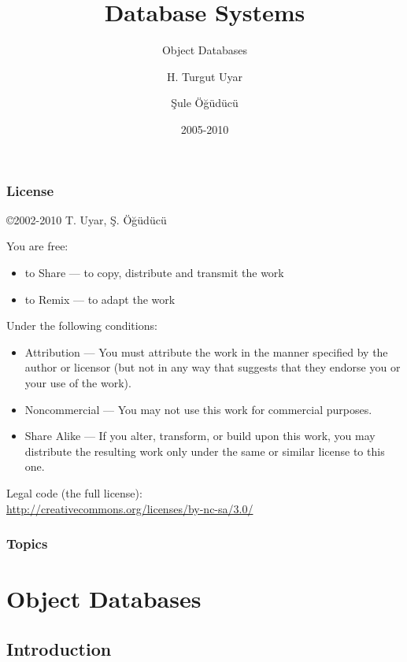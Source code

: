 \documentclass[dvipsnames]{beamer}
\title{Database Systems}
\subtitle{Object Databases}
\author{H. Turgut Uyar \and Şule Öğüdücü}
\date{2005-2010}
\theoremstyle{plain}
\begin{document}
\begin{frame}
  \titlepage
\end{frame}

\begin{frame}
  \frametitle{License}

  \hfill
  \copyright 2002-2010 T. Uyar, Ş. Öğüdücü

  \vfill
  \begin{tiny}
    You are free:
    \begin{itemize}
      \item to Share — to copy, distribute and transmit the work
      \item to Remix — to adapt the work
    \end{itemize}

    Under the following conditions:
    \begin{itemize}
      \item Attribution — You must attribute the work in the manner specified by
        the author or licensor (but not in any way that suggests that they
        endorse you or your use of the work).

      \item Noncommercial — You may not use this work for commercial purposes.

      \item Share Alike — If you alter, transform, or build upon this work, you
        may distribute the resulting work only under the same or similar license
        to this one.
    \end{itemize}
  \end{tiny}

  \vfill
  Legal code (the full license):\\
  \url{http://creativecommons.org/licenses/by-nc-sa/3.0/}
\end{frame}

\begin{frame}
  \frametitle{Topics}
  \tableofcontents
\end{frame}

\section{Object Databases}

\subsection{Introduction}
\end{document}
